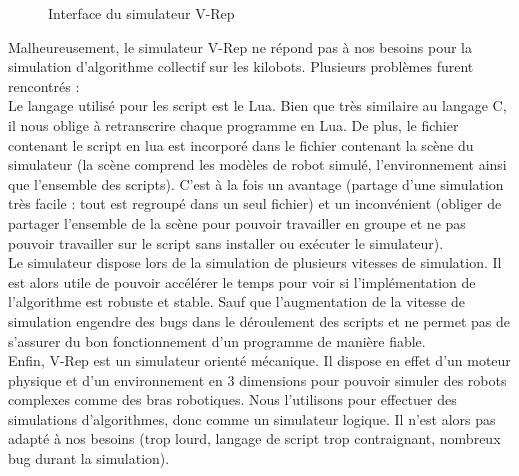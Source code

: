 \documentclass[a4paper,8pt]{report}
\begin{document}
\begin{figure}[!h]
    \centering
    \caption{Interface du simulateur V-Rep}
\end{figure}

\medskip
Malheureusement, le simulateur V-Rep ne r\'epond pas \`a nos besoins pour la simulation d'algorithme collectif sur les kilobots. Plusieurs probl\`emes furent rencontr\'es : \\ 

\medskip
Le langage utilis\'e pour les script est le Lua. Bien que tr\`es similaire au langage C, il nous oblige \`a retranscrire chaque programme en Lua. De plus, le fichier contenant le script en lua est incorpor\'e dans le fichier contenant la sc\`ene du simulateur (la sc\`ene comprend les mod\`eles de robot simul\'e, l'environnement ainsi que l'ensemble des scripts). C'est \`a la fois un avantage (partage d'une simulation tr\`es facile : tout est regroup\'e dans un seul fichier) et un inconv\'enient (obliger de partager l'ensemble de la sc\`ene pour pouvoir travailler en groupe et ne pas pouvoir travailler sur le script sans installer ou ex\'ecuter le simulateur).\\

\medskip
Le simulateur dispose lors de la simulation de plusieurs vitesses de simulation. Il est alors utile de pouvoir acc\'el\'erer le temps pour voir si l'impl\'ementation de l'algorithme est robuste et stable. Sauf que l'augmentation de la vitesse de simulation engendre des bugs dans le d\'eroulement des scripts et ne permet pas de s'assurer du bon fonctionnement d'un programme de mani\`ere fiable.\\

\medskip
Enfin, V-Rep est un simulateur orient\'e m\'ecanique. Il dispose en effet d'un moteur physique et d'un environnement en 3 dimensions pour pouvoir simuler des robots complexes comme des bras robotiques. Nous l'utilisons pour effectuer des simulations d'algorithmes, donc comme un simulateur logique. Il n'est alors pas adapt\'e \`a nos besoins (trop lourd, langage de script trop contraignant, nombreux bug durant la simulation).\\
\end{document}
